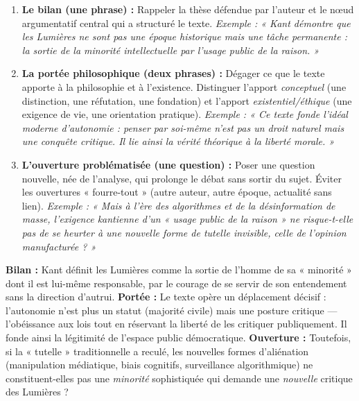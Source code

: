 \documentclass[11pt]{article}
\newcommand{\cle}[1]{{\popxbold\color{popdark}#1}}
\begin{document}
\begin{methode}
\begin{enumerate}
    \item \textbf{Le bilan (une phrase) :} Rappeler la thèse défendue par l'auteur et le nœud argumentatif central qui a structuré le texte. \emph{Exemple : « Kant démontre que les Lumières ne sont pas une époque historique mais une tâche permanente : la sortie de la minorité intellectuelle par l'usage public de la raison. »}
    \item \textbf{La portée philosophique (deux phrases) :} Dégager ce que le texte apporte à la philosophie et à l'existence. Distinguer l'apport \emph{conceptuel} (une distinction, une réfutation, une fondation) et l'apport \emph{existentiel/éthique} (une exigence de vie, une orientation pratique). \emph{Exemple : « Ce texte fonde l'idéal moderne d'autonomie : penser par soi-même n'est pas un droit naturel mais une conquête critique. Il lie ainsi la vérité théorique à la liberté morale. »}
    \item \textbf{L'ouverture problématisée (une question) :} Poser une question nouvelle, née de l'analyse, qui prolonge le débat sans sortir du sujet. Éviter les ouvertures « fourre-tout » (autre auteur, autre époque, actualité sans lien). \emph{Exemple : « Mais à l'ère des algorithmes et de la désinformation de masse, l'exigence kantienne d'un « usage public de la raison » ne risque-t-elle pas de se heurter à une nouvelle forme de tutelle invisible, celle de l'opinion manufacturée ? »}
\end{enumerate}
\end{methode}

\begin{exemplebox}
\textbf{Bilan :} Kant définit les Lumières comme la sortie de l'homme de sa « minorité » dont il est lui-même responsable, par le courage de se servir de son entendement sans la direction d'autrui.
\textbf{Portée :} Le texte opère un déplacement décisif : l'autonomie n'est plus un statut (majorité civile) mais une \cle{posture critique} — l'obéissance aux lois tout en réservant la liberté de les critiquer publiquement. Il fonde ainsi la légitimité de l'espace public démocratique.
\textbf{Ouverture :} Toutefois, si la « tutelle » traditionnelle a reculé, les nouvelles formes d'aliénation (manipulation médiatique, biais cognitifs, surveillance algorithmique) ne constituent-elles pas une \emph{minorité} sophistiquée qui demande une \emph{nouvelle} critique des Lumières ?
\end{exemplebox}
\end{document}
